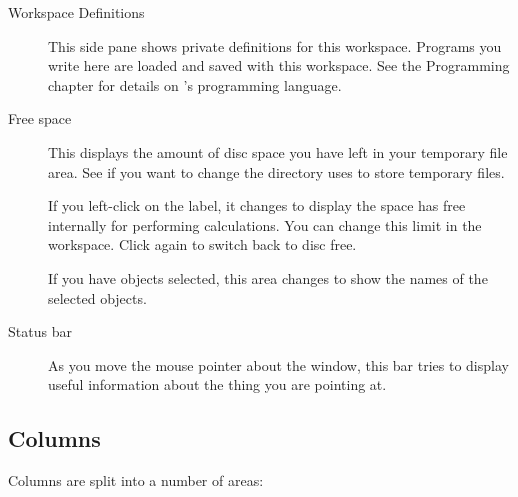 \begin{description}
\item[Workspace Definitions]
This side pane shows private definitions for this workspace. Programs you
write here are loaded and saved with this workspace. See the Programming
chapter for details on \nip{}'s programming language.

\item[Free space]
This displays the amount of disc space you have left in your temporary
file area. See  if you want to change the directory \nip{}
uses to store temporary files.

If you left-click on the label, it changes to display the space \nip{} has
free internally for performing calculations. You can change this limit in the
 workspace. Click again to switch back to disc free.

If you have objects selected, this area changes to show the
names of the selected objects.

\item[Status bar]
As you move the mouse pointer about the window, this bar tries to display
useful information about the thing you are pointing at. 

\end{description}

\subsection{Columns}

Columns are split into a number of areas:

